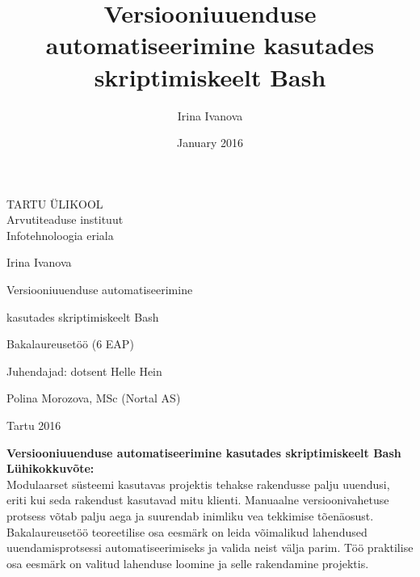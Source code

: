 \documentclass[12pt]{article}
\title{Versiooniuuenduse automatiseerimine kasutades skriptimiskeelt Bash}
\author{Irina Ivanova}
\date{January 2016}
\begin{document}
  \begin{titlepage}
    \begin{center}
      TARTU ÜLIKOOL\\
      Arvutiteaduse instituut\\
      Infotehnoloogia eriala
    \end{center}
      
    \vspace{5cm}
    
    \begin{center}  
      {\Large Irina Ivanova}
    \end{center}
    \begin{center}      
      {\huge Versiooniuuenduse automatiseerimine}
    \end{center}
    \begin{center}
      {\huge kasutades skriptimiskeelt Bash}
    \end{center}
    \begin{center}
      {\large Bakalaureusetöö (6 EAP)}
    \end{center}
      
    \vspace{4cm}
    \hspace{4.5cm}
    Juhendajad: dotsent Helle Hein
    
    \hspace{7cm}
    Polina Morozova, MSc (Nortal AS)
      
    \vspace{2.5cm}
    \begin{center}
      Tartu 2016
    \end{center}
  \end{titlepage}

  \newpage
  
  \noindent\textbf{Versiooniuuenduse automatiseerimine kasutades skriptimiskeelt Bash}\\
  
  \noindent\textbf{Lühikokkuvõte:}\\
  Modulaarset süsteemi kasutavas projektis tehakse rakendusse palju uuendusi, eriti kui seda rakendust kasutavad mitu klienti. Manuaalne versioonivahetuse protsess võtab palju aega ja suurendab inimliku vea tekkimise tõenäosust. Bakalaureusetöö teoreetilise osa eesmärk on leida võimalikud lahendused uuendamisprotsessi automatiseerimiseks ja valida neist välja parim. Töö praktilise osa eesmärk on valitud lahenduse loomine ja selle rakendamine projektis.\\
  
\end{document}
